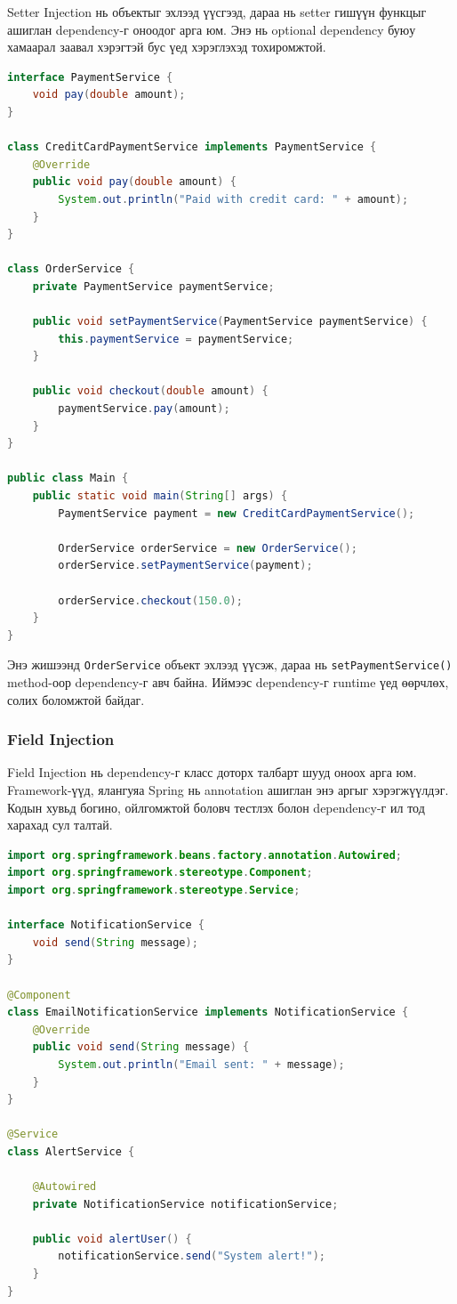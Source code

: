 Setter Injection нь объектыг эхлээд үүсгээд, дараа нь setter гишүүн функцыг ашиглан dependency-г оноодог арга юм. Энэ нь optional dependency буюу хамаарал заавал хэрэгтэй бус үед хэрэглэхэд тохиромжтой.

\begin{lstlisting}[language=Java, caption={Setter Injection жишээ}, label={lst:setter-injection}]
interface PaymentService {
    void pay(double amount);
}

class CreditCardPaymentService implements PaymentService {
    @Override
    public void pay(double amount) {
        System.out.println("Paid with credit card: " + amount);
    }
}

class OrderService {
    private PaymentService paymentService;

    public void setPaymentService(PaymentService paymentService) {
        this.paymentService = paymentService;
    }

    public void checkout(double amount) {
        paymentService.pay(amount);
    }
}

public class Main {
    public static void main(String[] args) {
        PaymentService payment = new CreditCardPaymentService();

        OrderService orderService = new OrderService();
        orderService.setPaymentService(payment);

        orderService.checkout(150.0);
    }
}
\end{lstlisting}

Энэ жишээнд \texttt{OrderService} объект эхлээд үүсэж, дараа нь \texttt{setPaymentService()} method-оор dependency-г авч байна. Иймээс dependency-г runtime үед өөрчлөх, солих боломжтой байдаг.


\newpage
\subsubsection{Field Injection}

Field Injection нь dependency-г класс доторх талбарт шууд оноох арга юм. Framework-үүд, ялангуяа Spring нь annotation ашиглан энэ аргыг хэрэгжүүлдэг. Кодын хувьд богино, ойлгомжтой боловч тестлэх болон dependency-г ил тод харахад сул талтай.

\begin{lstlisting}[language=Java, caption={Field Injection жишээ}, label={lst:field-injection}]
import org.springframework.beans.factory.annotation.Autowired;
import org.springframework.stereotype.Component;
import org.springframework.stereotype.Service;

interface NotificationService {
    void send(String message);
}

@Component
class EmailNotificationService implements NotificationService {
    @Override
    public void send(String message) {
        System.out.println("Email sent: " + message);
    }
}

@Service
class AlertService {

    @Autowired
    private NotificationService notificationService;

    public void alertUser() {
        notificationService.send("System alert!");
    }
}
\end{lstlisting}

